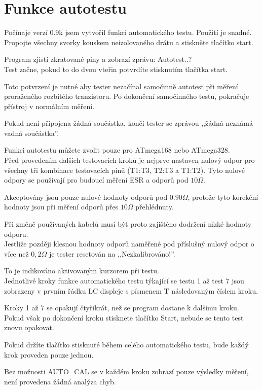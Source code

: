 
\section{Funkce autotestu}
\label{sec:selftest}
Počínaje verzí 0.9k jsem vytvořil funkci automatického testu.
Použití je snadné.
Propojte všechny svorky kouskem neizolovaného drátu a stiskněte tlačítko start.

Program zjistí zkratované piny a zobrazí zprávu: Autotest..?\\
Test začne, pokud to do dvou vteřin potvrdíte stisknutím tlačítka start.

Toto potvrzení je nutné aby tester nezačínal samočinně autotest při měření proraženého rozbitého tranzistoru.
Po dokončení samočinného testu, pokračuje přístroj v normálním měření.

Pokud není připojena žádná součástka, končí tester se zprávou ,,žádná neznámá vadná součástka''.

Funkci autotestu můžete zvolit pouze pro ATmega168 nebo ATmega328.\\
Před provedením dalších testovacích kroků je nejprve nastaven nulový odpor pro všechny tři kombinace testovacích pinů
(T1:T3, T2:T3 a T1:T2). Tyto nulové odpory se používají pro budoucí měření ESR a odporů pod \(10\Omega\).
 
Akceptovány jsou pouze nulové hodnoty odporů pod \(0.90\Omega\), protože tyto korekční hodnoty jsou při měření odporů přes \(10\Omega\) přehlédnuty.

Při změně používaných kabelů musí být proto zajištěno dodržení nízké hodnoty odporu.\\
Jestliže později klesnou hodnoty odporů naměřené pod příslušný nulový odpor o více než \(0,2\Omega\) je tester resetován na ,,Nezkalibrováno!''.
 
To je indikováno aktivovaným kurzorem při testu.\\
Jednotlivé kroky funkce automatického testu týkající se testu 1 až test 7 jsou zobrazeny v prvním řádku LC displeje s písmenem T následovaným číslem kroku.

Kroky 1 až 7 se opakují čtyřikrát, než se program dostane k dalšímu kroku.\\
Pokud však po dokončení kroku stisknete tlačítko Start, nebude se tento test znovu opakovat.

Pokud držíte tlačítko stisknuté během celého automatického testu, bude každý krok proveden pouze jednou.

Bez možnosti AUTO\_CAL se v každém kroku zobrazí pouze výsledky měření, není provedena žádná analýza chyb.

